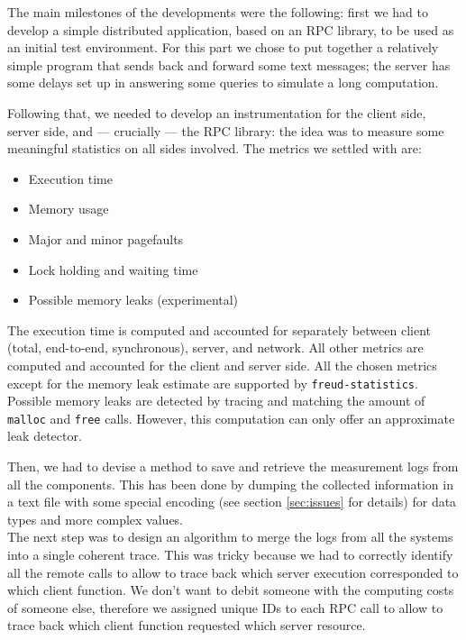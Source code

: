         The main milestones of the developments were the following: first we had to develop a
        simple distributed application, based on an RPC library, to be used as an initial test environment.
        For this part we chose to put together a relatively simple program that sends back and forward
        some text messages; the server has some delays set up in answering some queries to simulate a
        long computation.

        Following that, we needed to develop an instrumentation for the
        client side, server side, and --- crucially --- the RPC library:
        the idea was to measure some meaningful statistics on all
        sides involved.  The metrics we settled with are:

        \begin{itemize}
            \item Execution time
            \item Memory usage
            \item Major and minor pagefaults
            \item Lock holding and waiting time
            \item Possible memory leaks (experimental)
        \end{itemize}

        The execution time is computed and accounted for separately
        between client (total, end-to-end, synchronous), server, and
        network.  All other metrics are computed and accounted for the
        client and server side.  All the chosen metrics except for the
        memory leak estimate are supported by
        \texttt{freud-statistics}.  Possible memory leaks are detected
        by tracing and matching the amount of \texttt{malloc} and
        \texttt{free} calls.  However, this computation can only offer
        an approximate leak detector.

        Then, we had to devise a method to save and retrieve the measurement logs from all the components.
        This has been done by dumping the collected information in a text file with some special encoding
        (see section \ref{sec:issues} for details) for data types and more complex values.\\

        The next step was to design an algorithm to merge the logs from all the systems into a single
        coherent trace. This was tricky because we had to correctly identify all the remote calls to allow
        to trace back which server execution corresponded to which client function. We don't want to debit
        someone with the computing costs of someone else, therefore we assigned unique IDs to each
        RPC call to allow to trace back which client function requested which server resource.\\

